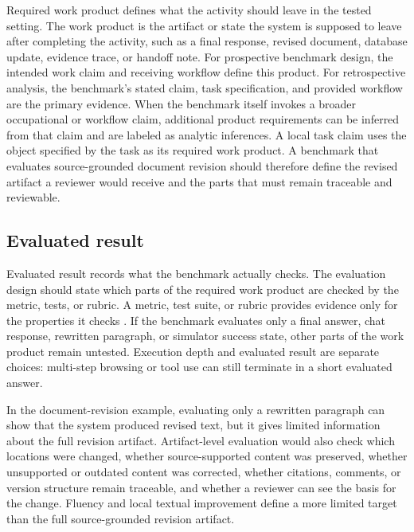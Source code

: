\documentclass[10pt]{article}
\begin{document}
Required work product defines what the activity should leave in the tested setting. The work product is the artifact or state the system is supposed to leave after completing the activity, such as a final response, revised document, database update, evidence trace, or handoff note. For prospective benchmark design, the intended work claim and receiving workflow define this product. For retrospective analysis, the benchmark's stated claim, task specification, and provided workflow are the primary evidence. When the benchmark itself invokes a broader occupational or workflow claim, additional product requirements can be inferred from that claim and are labeled as analytic inferences. A local task claim uses the object specified by the task as its required work product. A benchmark that evaluates source-grounded document revision should therefore define the revised artifact a reviewer would receive and the parts that must remain traceable and reviewable.

\subsection{Evaluated result}
\label{sec:scored-object}

Evaluated result records what the benchmark actually checks.
The evaluation design should state which parts of the required work product are checked by the metric, tests, or rubric.
A metric, test suite, or rubric provides evidence only for the properties it checks \citep{messick1989validity,kane2013validating}.
If the benchmark evaluates only a final answer, chat response, rewritten paragraph, or simulator success state, other parts of the work product remain untested.
Execution depth and evaluated result are separate choices: multi-step browsing or tool use can still terminate in a short evaluated answer.

In the document-revision example, evaluating only a rewritten paragraph can show that the system produced revised text, but it gives limited information about the full revision artifact.
Artifact-level evaluation would also check which locations were changed, whether source-supported content was preserved, whether unsupported or outdated content was corrected, whether citations, comments, or version structure remain traceable, and whether a reviewer can see the basis for the change.
Fluency and local textual improvement define a more limited target than the full source-grounded revision artifact.
\end{document}
